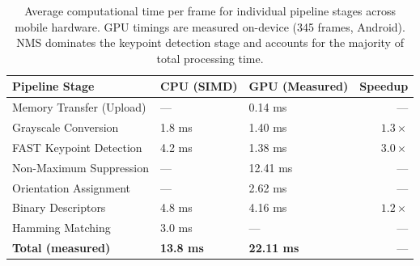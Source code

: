 \begin{table}[htbp]
\centering
\caption{Average computational time per frame for individual pipeline stages across mobile hardware. GPU timings are measured on-device (345 frames, Android). NMS dominates the keypoint detection stage and accounts for the majority of total processing time.}
\label{tab:profiling}
\begin{tabular}{@{}lllr@{}}
\toprule
\textbf{Pipeline Stage} & \textbf{CPU (SIMD)} & \textbf{GPU (Measured)} & \textbf{Speedup} \\
\midrule
Memory Transfer (Upload) & ---     & 0.14 ms  & ---          \\
Grayscale Conversion      & 1.8 ms  & 1.40 ms  & $1.3\times$  \\
FAST Keypoint Detection   & 4.2 ms  & 1.38 ms  & $3.0\times$  \\
Non-Maximum Suppression   & ---     & 12.41 ms & ---          \\
Orientation Assignment    & ---     & 2.62 ms  & ---          \\
Binary Descriptors        & 4.8 ms  & 4.16 ms  & $1.2\times$  \\
Hamming Matching          & 3.0 ms  & ---      & ---          \\
\midrule
\textbf{Total (measured)} & \textbf{13.8 ms} & \textbf{22.11 ms} & --- \\
\bottomrule
\end{tabular}
\end{table}

